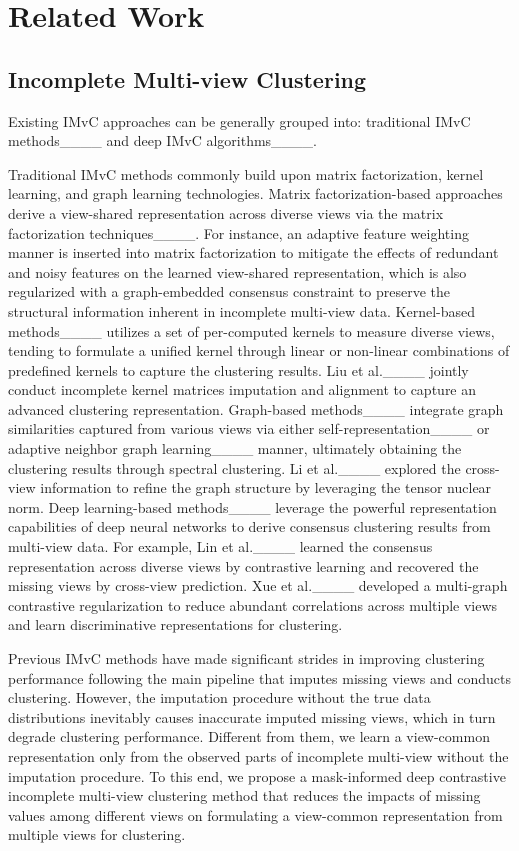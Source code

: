 \section{Related Work}
\label{sec:sec2}

\subsection{Incomplete Multi-view Clustering}

Existing IMvC approaches can be generally grouped into: traditional IMvC methods____ and deep IMvC algorithms____. 

Traditional IMvC methods commonly build upon matrix factorization, kernel learning, and graph learning technologies. Matrix factorization-based approaches derive a view-shared representation across diverse views via the matrix factorization techniques____. For instance, an adaptive feature weighting manner is inserted into matrix factorization to mitigate the effects of redundant and noisy features on the learned view-shared representation, which is also regularized with a graph-embedded consensus constraint to preserve the structural information inherent in incomplete multi-view data. Kernel-based methods____ utilizes a set of per-computed kernels to measure diverse views, tending to formulate a unified kernel through linear or non-linear combinations of predefined kernels to capture the clustering results. Liu et al.____ jointly conduct incomplete kernel matrices imputation and alignment to capture an advanced clustering representation. Graph-based methods____ integrate graph similarities captured from various views via either self-representation____ or adaptive neighbor graph learning____ manner, ultimately obtaining the clustering results through spectral clustering. Li et al.____ explored the cross-view information to refine the graph structure by leveraging the tensor nuclear norm. Deep learning-based methods____ leverage the powerful representation capabilities of deep neural networks to derive consensus clustering results from multi-view data. For example, Lin et al.____ learned the consensus representation across diverse views by contrastive learning and recovered the missing views by cross-view prediction. Xue et al.____ developed a multi-graph contrastive regularization to reduce abundant correlations
across multiple views and learn discriminative representations for clustering. 

Previous IMvC methods have made significant strides in improving clustering performance following the main pipeline that imputes missing views and conducts clustering. However, the imputation procedure without the true data distributions inevitably causes inaccurate imputed missing views, which in turn degrade clustering performance. Different from them, we learn a view-common representation only from the observed parts of incomplete multi-view without the imputation procedure. To this end, we propose a mask-informed deep contrastive incomplete multi-view clustering method that reduces the impacts of missing values among different views on formulating a view-common representation from multiple views for clustering.

